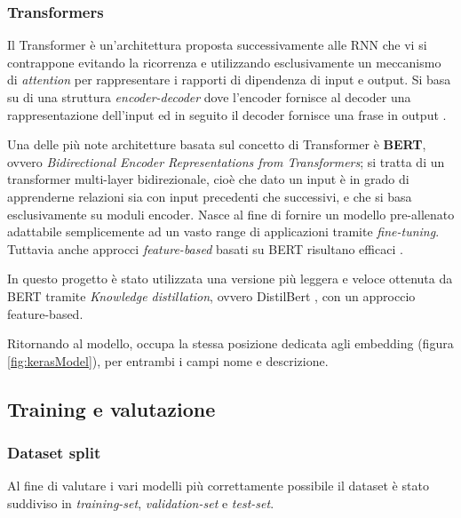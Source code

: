 \subsubsection{Transformers}
Il Transformer è un'architettura proposta successivamente alle RNN che vi si
contrappone evitando la ricorrenza e utilizzando esclusivamente un meccanismo di
\textit{attention} per rappresentare i rapporti di dipendenza di input e output.
Si basa su di una struttura \textit{encoder-decoder} dove l'encoder fornisce al
decoder una rappresentazione dell'input ed in seguito il decoder fornisce una
frase in output \cite{vaswani2017attention}.



Una delle più note architetture basata sul concetto di Transformer è
\textbf{BERT}, ovvero \textit{Bidirectional Encoder Representations from
Transformers}; si tratta di un transformer multi-layer bidirezionale, cioè 
che dato un input è in grado di apprenderne relazioni sia con input precedenti
che successivi, e che si basa esclusivamente su
 moduli encoder. Nasce al fine di fornire un modello
pre-allenato adattabile semplicemente ad un vasto range di applicazioni tramite
\textit{fine-tuning}. Tuttavia anche approcci \textit{feature-based} basati
su BERT risultano efficaci \cite{devlin2018bert}.

In questo progetto è stato utilizzata una versione più leggera e veloce ottenuta
da BERT tramite \textit{Knowledge distillation}, ovvero DistilBert
\cite{sanh2020distilbert}, con un approccio feature-based.

Ritornando al modello, occupa la stessa posizione dedicata agli embedding
(figura \ref{fig:kerasModel}), per entrambi i campi nome e descrizione.

\subsection{Training e valutazione}

\subsubsection{Dataset split}

Al fine di valutare i vari modelli più correttamente possibile il dataset è
stato suddiviso in \textit{training-set}, \textit{validation-set} e
\textit{test-set}.

